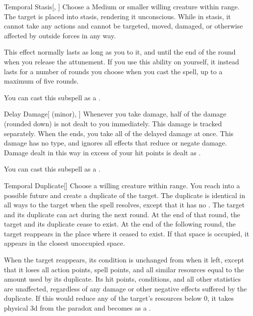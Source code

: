\begin{ability}[\nth{3}]{Temporal Stasis}[, ]
Choose a Medium or smaller willing creature within \rngmed range.
The target is placed into stasis, rendering it unconscious.
While in stasis, it cannot take any actions and cannot be targeted, moved, damaged, or otherwise affected by outside forces in any way.

This effect normally lasts as long as you  to it, and until the end of the round when you release the attunement.
If you use this ability on yourself, it instead lasts for a number of rounds you choose when you cast the spell, up to a maximum of five rounds.

You can cast this subspell as a .
\end{ability}
\vspace{0.25em}


\begin{ability}[\nth{4}]{Delay Damage}[ (minor), ]
Whenever you take damage, half of the damage (rounded down) is not dealt to you immediately.
This damage is tracked separately.
When the ends, you take all of the delayed damage at once.
This damage has no type, and ignores all effects that reduce or negate damage.
Damage dealt in this way in excess of your hit points is dealt as .

You can cast this subspell as a .
\end{ability}
\vspace{0.25em}


\begin{ability}[\nth{5}]{Temporal Duplicate}[]
Choose a willing creature within \rngmed range.
You reach into a possible future and create a duplicate of the target.
The duplicate is identical in all ways to the target when the spell resolves, except that it has no .
The target and its duplicate can act during the next round.
At the end of that round, the target and its duplicate cease to exist.
At the end of the following round, the target reappears in the place where it ceased to exist.
If that space is occupied, it appears in the closest unoccupied space.

When the target reappears, its condition is unchanged from when it left, except that it loses all action points, spell points, and all similar resources equal to the amount used by its duplicate.
Its hit points, conditions, and all other statistics are unaffected, regardless of any damage or other negative effects suffered by the duplicate.
If this would reduce any of the target's resources below 0, it takes physical  \plus3d from the paradox and becomes  as a .
\end{ability}
\vspace{0.25em}


